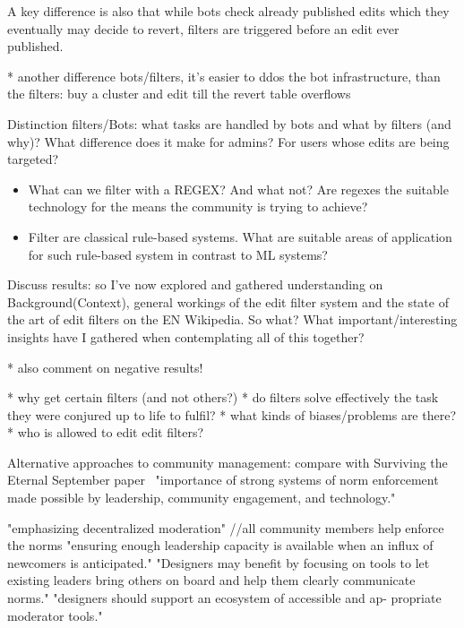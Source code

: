 A key difference is also that while bots check already published edits which they eventually may decide to revert, filters are triggered before an edit ever published.

* another difference bots/filters, it's easier to ddos the bot infrastructure, than the filters: buy a cluster and edit till the revert table overflows

Distinction filters/Bots: what tasks are handled by bots and what by filters (and why)? What difference does it make for admins? For users whose edits are being targeted? %

\begin{itemize}
    \item What can we filter with a REGEX? And what not? Are regexes the suitable technology for the means the community is trying to achieve?
    \item Filter are classical rule-based systems. What are suitable areas of application for such rule-based system in contrast to ML systems?
\end{itemize}

Discuss results:
so I've now explored and gathered understanding on Background(Context), general workings of the edit filter system and the state of the art of edit filters on the EN Wikipedia.
So what? What important/interesting insights have I gathered when contemplating all of this together?

* also comment on negative results!

* why get certain filters (and not others?)
* do filters solve effectively the task they were conjured up to life to fulfil?
* what kinds of biases/problems are there?
* who is allowed to edit edit filters?

Alternative approaches to community management:
compare with Surviving the Eternal September paper~\cite{KieMonHill2016}
"importance of strong
systems of norm enforcement made possible by leadership,
community engagement, and technology."

"emphasizing decentralized moderation" //all community members help enforce the norms
"ensuring enough leadership capacity is available
when an influx of newcomers is anticipated."
"Designers may
benefit by focusing on tools to let existing leaders bring others
on board and help them clearly communicate norms."
"designers should support an ecosystem of accessible and ap-
propriate moderator tools."

